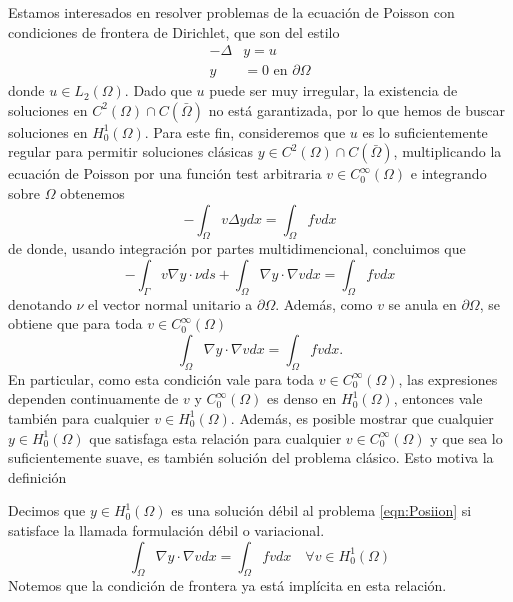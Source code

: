 \documentclass{article}
\begin{document}
\noindent
Estamos interesados en resolver problemas de la ecuación de Poisson con condiciones de frontera de Dirichlet, que son del estilo 
\begin{equation}
\label{eqn:Posiion}
    \begin{split}
        -\Delta &y=u\\
        y&=0 \text{ en } \partial\Omega
    \end{split}
\end{equation}
donde $u\in L_2(\Omega)$. Dado que $u$ puede ser muy irregular, la existencia de soluciones en $C^2(\Omega)\cap C(\bar{\Omega})$ no está garantizada, por lo que hemos de buscar soluciones en $H_0^1(\Omega)$. Para este fin, consideremos que $u$ es lo suficientemente regular para permitir soluciones clásicas $y\in C^2(\Omega)\cap C(\bar{\Omega})$, multiplicando la ecuación de Poisson por una función test arbitraria $v\in C_0^{\infty}(\Omega)$ e integrando sobre $\Omega$ obtenemos 
\begin{equation}-\int_{\Omega} v \Delta y d x=\int_{\Omega} f v d x\end{equation}
de donde, usando integración por partes multidimencional, concluimos que
\begin{equation}-\int_{\Gamma} v \nabla y\cdot\nu d s+\int_{\Omega} \nabla y \cdot \nabla v d x=\int_{\Omega} f v d x\end{equation}
denotando $\nu$ el vector normal unitario a $\partial \Omega$. Además, como $v$ se anula en $\partial \Omega$, se obtiene que para toda $v\in C_0^{\infty}(\Omega)$
\begin{equation}\int_{\Omega} \nabla y \cdot \nabla v d x=\int_{\Omega} f v d x.\end{equation}
En particular, como esta condición vale para toda $v\in C_0^{\infty}(\Omega)$, las expresiones dependen continuamente de $v$ y $C_0^{\infty}(\Omega)$ es denso en $H_0^{1}(\Omega)$, entonces vale también para cualquier $v\in H_0^{1}(\Omega)$. Además, es posible mostrar que cualquier $y\in H_0^{1}(\Omega)$ que satisfaga esta relación para cualquier $v \in C_0^{\infty}(\Omega)$ y que sea lo suficientemente suave, es también solución del problema clásico. Esto motiva la definición

\theoremstyle{definition}
\begin{definition}
Decimos que $y\in H_0^{1}(\Omega)$ es una solución débil al problema  \ref{eqn:Posiion} si satisface la llamada formulación débil o variacional. 
\begin{equation}\int_{\Omega} \nabla y \cdot \nabla v d x=\int_{\Omega} f v d x \quad \forall v \in H_{0}^{1}(\Omega)\end{equation}
Notemos que la condición de frontera ya está implícita en esta relación.
\end{definition}
\end{document}
